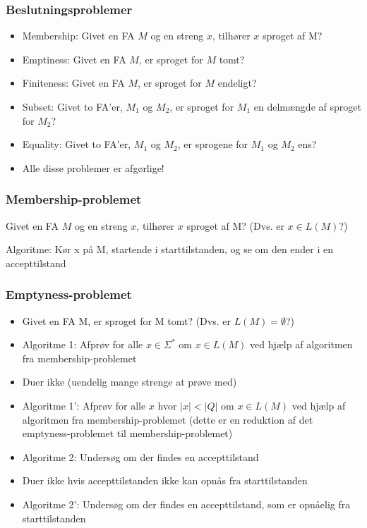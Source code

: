 \begin{frame}
\frametitle{Beslutningsproblemer}
\begin{itemize}[<+->]
\item  Membership: Givet en FA $M$ og en streng $x$, tilhører $x$  
    sproget af M? 
\item  Emptiness:  Givet en FA $M$, er sproget for $M$ tomt? 
\item  Finiteness:  Givet en FA $M$, er sproget for $M$ endeligt? 
\item  Subset:  Givet to FA’er, $M_1$ og $M_2$, er sproget for $M_1$ en  
       delmængde af sproget for $M_2$? 
\item  Equality:  Givet to FA’er, $M_1$ og $M_2$, er sprogene for $M_1$  
                og $M_2$ ens? 
\item  Alle disse problemer er afgørlige!
\end{itemize}
\end{frame}

\begin{frame}
\frametitle{Membership-problemet}
Givet en FA $M$ og en streng $x$, tilhører $x$ sproget af M? 
(Dvs. er $x\in L(M)$?)
\pause

Algoritme: 
Kør x på M, startende i starttilstanden, og se om den  
ender i en accepttilstand
\end{frame}

\begin{frame}
\frametitle{Emptyness-problemet}
\begin{itemize}[<+->]
\item Givet en FA M, er sproget for M tomt? 
(Dvs. er $L(M)=\emptyset$?) 
\item Algoritme 1:
  Afprøv for alle $x\in \Sigma^*$ om $x\in L(M)$ ved hjælp af  
  algoritmen fra membership-problemet
\item Duer ikke (uendelig mange strenge at prøve med)
\item
  Algoritme 1': Afprøv for alle $x$ hvor $|x|<|Q|$ om $x\in L(M)$ ved
  hjælp af algoritmen fra membership-problemet (dette er en reduktion
  af det emptyness-problemet til membership-problemet)
\item
  Algoritme 2: 
  Undersøg om der findes en accepttilstand
\item Duer ikke hvis accepttilstanden ikke kan opnås fra starttilstanden
\item
  Algoritme 2': 
  Undersøg om der findes en accepttilstand, som er  
  opnåelig fra starttilstanden

\end{itemize}
\end{frame}

